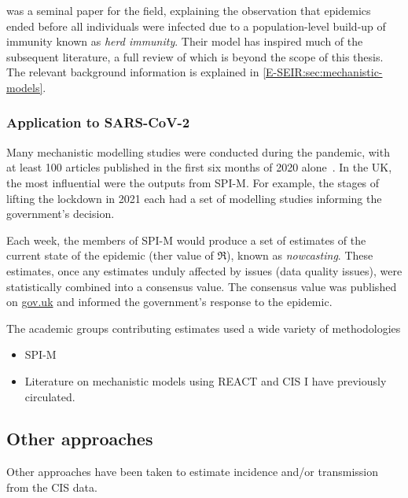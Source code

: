 \documentclass[thesis.tex]{subfiles}
\begin{document}
\Textcite{kermackContribution} was a seminal paper for the field, explaining the observation that epidemics ended before all individuals were infected due to a population-level build-up of immunity known as \emph{herd immunity}.
Their model has inspired much of the subsequent literature, a full review of which is beyond the scope of this thesis.
The relevant background information is explained in \cref{E-SEIR:sec:mechanistic-models}.

\subsubsection{Application to SARS-CoV-2}

Many mechanistic modelling studies were conducted during the pandemic, with at least 100 articles published in the first six months of 2020 alone~\autocite{shankarSystematic}.
In the UK, the most influential were the outputs from SPI-M.
For example, the stages of lifting the lockdown in 2021 each had a set of modelling studies informing the government's decision.

Each week, the members of SPI-M would produce a set of estimates of the current state of the epidemic (\eg ther value of $\Re$), known as \emph{nowcasting}.
These estimates, once any estimates unduly affected by issues (\eg data quality issues), were statistically combined into a consensus value.
The consensus value was published on \url{gov.uk} and informed the government's response to the epidemic.

The academic groups contributing estimates used a wide variety of methodologies


\begin{itemize}
    \item SPI-M
    \item Literature on mechanistic models using REACT and CIS I have previously circulated.
\end{itemize}

\subsection{Other approaches}

Other approaches have been taken to estimate incidence and/or transmission from the CIS data.
\end{document}
